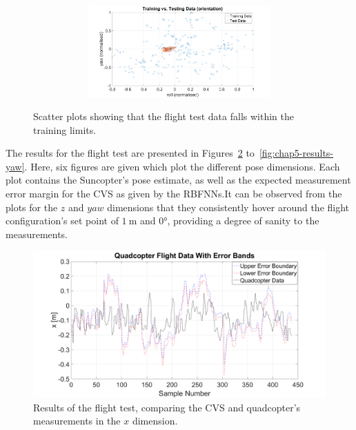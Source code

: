 \begin{figure}
\begin{subfigure}{\textwidth}
\begin{subfigure}{0.48\textwidth}
    \end{subfigure}
    \begin{subfigure}{0.48\textwidth}
      \includegraphics[clip, trim = 80 0 100 0, width=\textwidth]{figures/chapter5/tr_v_ts_rollyaw}
    \end{subfigure}
    \caption{}
  \end{subfigure}
  \caption[Scatter plots of flight data vs.\ training data. ]{Scatter plots showing that the flight test data falls within the training limits. }
\label{fig:chap5-ts-tr-scatter}
\end{figure}

The results for the flight test are presented in Figures~\ref{fig:chap5-results-x} to~\ref{fig:chap5-results-yaw}. Here, six figures are given which plot the different pose dimensions. Each plot contains the Suncopter's pose estimate, as well as the expected measurement error margin for the CVS as given by the RBFNNs.\@ It can be observed from the plots for the $z$ and $yaw$ dimensions that they consistently hover around the flight configuration's set point of $\SI{1}{\m}$ and $\ang{0}$, providing a degree of sanity to the measurements. 

\begin{figure}
  \centering
  \includegraphics[clip, trim = 80 0 100 0, width = \textwidth]{figures/chapter5/ts_x}
  \caption{Results of the flight test, comparing the CVS and quadcopter's measurements in the $x$ dimension.}
  \label{fig:chap5-results-x}
\end{figure}


